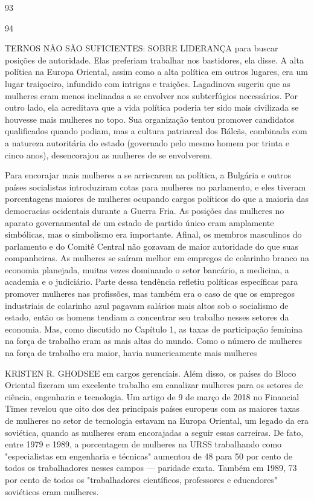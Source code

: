  \par 
93
 \par 
94
 \par 
TERNOS NÃO SÃO SUFICIENTES: SOBRE LIDERANÇA para buscar posições de autoridade. Elas preferiam trabalhar nos bastidores, ela disse. A alta política na Europa Oriental, assim como a alta política em outros lugares, era um lugar traiçoeiro, infundido com intrigas e traições. Lagadinova sugeriu que as mulheres eram menos inclinadas a se envolver nos subterfúgios necessários. Por outro lado, ela acreditava que a vida política poderia ter sido mais civilizada se houvesse mais mulheres no topo. Sua organização tentou promover candidatos qualificados quando podiam, mas a cultura patriarcal dos Bálcãs, combinada com a natureza autoritária do estado (governado pelo mesmo homem por trinta e cinco anos), desencorajou as mulheres de se envolverem.
 \par 
Para encorajar mais mulheres a se arriscarem na política, a Bulgária e outros países socialistas introduziram cotas para mulheres no parlamento, e eles tiveram porcentagens maiores de mulheres ocupando cargos políticos do que a maioria das democracias ocidentais durante a Guerra Fria. As posições das mulheres no aparato governamental de um estado de partido único eram amplamente simbólicas, mas o simbolismo era importante. Afinal, os membros masculinos do parlamento e do Comitê Central não gozavam de maior autoridade do que suas companheiras. As mulheres se saíram melhor em empregos de colarinho branco na economia planejada, muitas vezes dominando o setor bancário, a medicina, a academia e o judiciário. Parte dessa tendência refletiu políticas específicas para promover mulheres nas profissões, mas também era o caso de que os empregos industriais de colarinho azul pagavam salários mais altos sob o socialismo de estado, então os homens tendiam a concentrar seu trabalho nesses setores da economia. Mas, como discutido no Capítulo 1, as taxas de participação feminina na força de trabalho eram as mais altas do mundo. Como o número de mulheres na força de trabalho era maior, havia numericamente mais mulheres
 \par 
KRISTEN R. GHODSEE em cargos gerenciais. Além disso, os países do Bloco Oriental fizeram um excelente trabalho em canalizar mulheres para os setores de ciência, engenharia e tecnologia. Um artigo de {\color{blue}9} de março de 2018 no Financial Times revelou que oito dos dez principais países europeus com as maiores taxas de mulheres no setor de tecnologia estavam na Europa Oriental, um legado da era soviética, quando as mulheres eram encorajadas a seguir essas carreiras. De fato, entre 1979 e 1989, a porcentagem de mulheres na URSS trabalhando como "especialistas em engenharia e técnicas" aumentou de {\color{blue}48} para {\color{blue}50} por cento de todos os trabalhadores nesses campos — paridade exata. Também em 1989, {\color{blue}73} por cento de todos os "trabalhadores científicos, professores e educadores" soviéticos eram mulheres.
